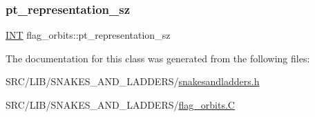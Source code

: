 \subsubsection{\texorpdfstring{pt\+\_\+representation\+\_\+sz}{pt\_representation\_sz}}
{\footnotesize\ttfamily \mbox{\hyperlink{galois_8h_a09fddde158a3a20bd2dcadb609de11dc}{I\+NT}} flag\+\_\+orbits\+::pt\+\_\+representation\+\_\+sz}



The documentation for this class was generated from the following files\+:\begin{DoxyCompactItemize}
\item 
S\+R\+C/\+L\+I\+B/\+S\+N\+A\+K\+E\+S\+\_\+\+A\+N\+D\+\_\+\+L\+A\+D\+D\+E\+R\+S/\mbox{\hyperlink{snakesandladders_8h}{snakesandladders.\+h}}\item 
S\+R\+C/\+L\+I\+B/\+S\+N\+A\+K\+E\+S\+\_\+\+A\+N\+D\+\_\+\+L\+A\+D\+D\+E\+R\+S/\mbox{\hyperlink{flag__orbits_8_c}{flag\+\_\+orbits.\+C}}\end{DoxyCompactItemize}
